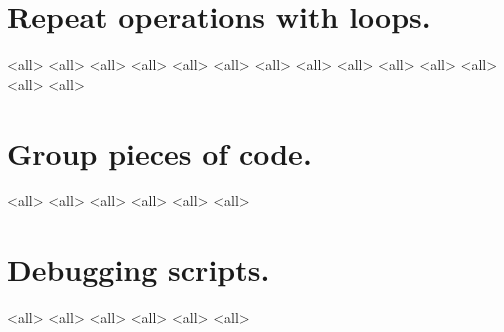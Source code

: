 \section{Repeat operations with loops.}
\mode<all>{}
\mode<all>{}
\mode<all>{}
\mode<all>{}
\mode<all>{}
\mode<all>{}
\mode<all>{}
\mode<all>{}
\mode<all>{}
\mode<all>{}
\mode<all>{}
\mode<all>{}
\mode<all>{}
\mode<all>{}
%
\section{Group pieces of code.}
\mode<all>{}
\mode<all>{}
\mode<all>{}
\mode<all>{}
\mode<all>{}
\mode<all>{}

\section{Debugging scripts.}
\mode<all>{}
\mode<all>{}
\mode<all>{}
\mode<all>{}
\mode<all>{}
\mode<all>{}



